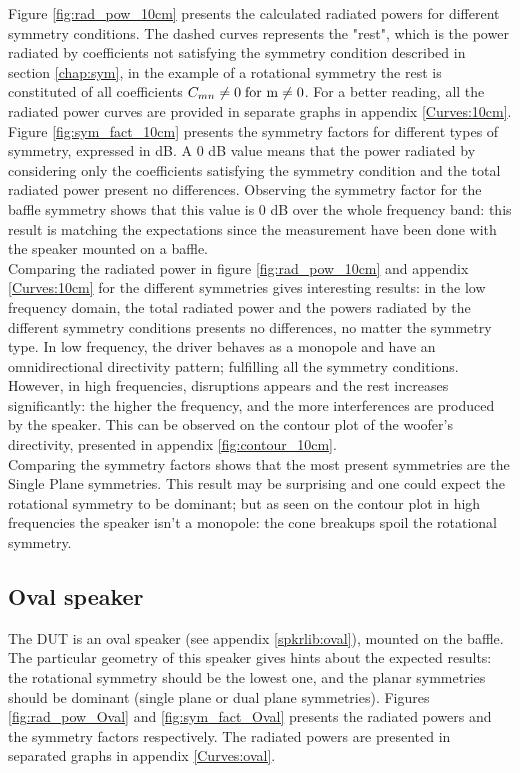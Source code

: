 \documentclass{report}
\begin{document}
Figure \ref{fig:rad_pow_10cm} presents the calculated radiated powers for different symmetry conditions. The dashed curves represents the "rest", which is the power radiated by coefficients not satisfying the symmetry condition described in section \ref{chap:sym}, in the example of a rotational symmetry the rest is constituted of all coefficients $C_{mn} \neq 0 \;  \textup{for m}  \neq 0$. For a better reading, all the radiated power curves are provided in separate graphs in appendix \ref{Curves:10cm}.\\

Figure \ref{fig:sym_fact_10cm} presents the symmetry factors for different types of symmetry, expressed in dB. A 0 dB value means that the power radiated by considering only the coefficients satisfying the symmetry condition and the total radiated power present no differences. Observing the symmetry factor for the baffle symmetry shows that this value is 0 dB over the whole frequency band: this result is matching the expectations since the measurement have been done with the speaker mounted on a baffle. \\

Comparing the radiated power in figure \ref{fig:rad_pow_10cm} and appendix \ref{Curves:10cm} for the different symmetries gives interesting results: in the low frequency domain, the total radiated power and the powers radiated by the different symmetry conditions presents no differences, no matter the symmetry type. In low frequency, the driver behaves as a monopole and have an omnidirectional directivity pattern; fulfilling all the symmetry conditions. \\
However, in high frequencies, disruptions appears and the rest increases significantly: the higher the frequency, and the more interferences are produced by the speaker. This can be observed on the contour plot of the woofer's directivity, presented in appendix \ref{fig:contour_10cm}. \\

Comparing the symmetry factors shows that the most present symmetries are the Single Plane symmetries. This result may be surprising and one could expect the rotational symmetry to be dominant; but as seen on the contour plot in high frequencies the speaker isn't a monopole: the cone breakups spoil the rotational symmetry. 

\newpage

\subsection{Oval speaker}
The DUT is an oval speaker (see appendix \ref{spkrlib:oval}), mounted on the baffle. The particular geometry of this speaker gives hints about the expected results: the rotational symmetry should be the lowest one, and the planar symmetries should be dominant (single plane or dual plane symmetries).  Figures \ref{fig:rad_pow_Oval} and \ref{fig:sym_fact_Oval} presents the radiated powers and the symmetry factors respectively. The radiated powers are presented in separated graphs in appendix \ref{Curves:oval}.\\
\end{document}
